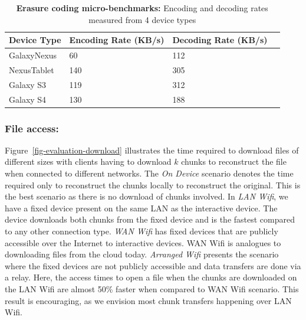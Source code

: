 \begin{table}[t]
{\small

\begin{tabularx}{\columnwidth}{XXXX}

\textbf{Device Type} & \textbf{Encoding Rate (KB/s)} & \textbf{Decoding Rate (KB/s)}
\\ \toprule
GalaxyNexus & 60 & 112  \\
NexusTablet & 140 & 305  \\
Galaxy S3 & 119 & 312  \\
Galaxy S4 & 130 & 188  \\

\end{tabularx}
}

\caption{\small \textbf{Erasure coding micro-benchmarks:}
Encoding and decoding rates measured from 4 device types}

\label{tab:coding-perf}

\end{table}

\subsubsection{File access:\space} \label{sec-fileaccess}
Figure~\ref{fig-evaluation-download} illustrates the time required to
download files of different sizes with clients having to download $k$ chunks
to reconstruct the file when connected to different networks. The \textit{On
Device} scenario denotes the time required only to reconstruct the chunks
locally to reconstruct the original. This is the best scenario as there is no
download of chunks involved. In \textit{LAN Wifi}, we have a fixed device
present on the same LAN as the interactive device. The device downloads both
chunks from the fixed device and is the fastest compared to any other
connection type. \textit{WAN Wifi} has fixed devices that are publicly
accessible over the Internet to interactive devices. WAN Wifi is analogues to
downloading files from the cloud today. \textit{Arranged Wifi} presents the
scenario where the fixed devices are not publicly accessible and data
transfers are done via a relay. Here, the access times to open a file when
the chunks are downloaded on the LAN Wifi are almost 50\% faster when
compared to WAN Wifi scenario. This result is encouraging, as we envision
most chunk transfers happening over LAN Wifi.


